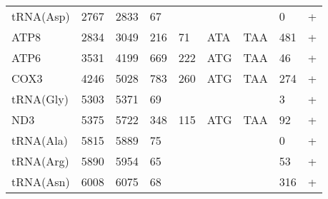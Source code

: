 \documentclass[../DISSERTACAO_MAIN.tex]{subfiles}
\begin{document}
\begin{longtable}{llllllllllllllllllllll}
			tRNA(Asp)    & 2767           & \multicolumn{2}{l}{2833}  & \multicolumn{2}{l}{67}         & \multicolumn{3}{l}{}                          & \multicolumn{3}{l}{}              & \multicolumn{3}{l}{}      & \multicolumn{3}{l}{0}           & \multicolumn{4}{l}{+}                  \\
			ATP8         & 2834           & \multicolumn{2}{l}{3049}  & \multicolumn{2}{l}{216}        & \multicolumn{3}{l}{71}                        & \multicolumn{3}{l}{ATA}           & \multicolumn{3}{l}{TAA}   & \multicolumn{3}{l}{481}         & \multicolumn{4}{l}{+}                  \\
			ATP6         & 3531           & \multicolumn{2}{l}{4199}  & \multicolumn{2}{l}{669}        & \multicolumn{3}{l}{222}                       & \multicolumn{3}{l}{ATG}           & \multicolumn{3}{l}{TAA}   & \multicolumn{3}{l}{46}          & \multicolumn{4}{l}{+}                  \\
			COX3         & 4246           & \multicolumn{2}{l}{5028}  & \multicolumn{2}{l}{783}        & \multicolumn{3}{l}{260}                       & \multicolumn{3}{l}{ATG}           & \multicolumn{3}{l}{TAA}   & \multicolumn{3}{l}{274}         & \multicolumn{4}{l}{+}                  \\
			tRNA(Gly)    & 5303           & \multicolumn{2}{l}{5371}  & \multicolumn{2}{l}{69}         & \multicolumn{3}{l}{}                          & \multicolumn{3}{l}{}              & \multicolumn{3}{l}{}      & \multicolumn{3}{l}{3}           & \multicolumn{4}{l}{+}                  \\
			ND3          & 5375           & \multicolumn{2}{l}{5722}  & \multicolumn{2}{l}{348}        & \multicolumn{3}{l}{115}                       & \multicolumn{3}{l}{ATG}           & \multicolumn{3}{l}{TAA}   & \multicolumn{3}{l}{92}          & \multicolumn{4}{l}{+}                  \\
			tRNA(Ala)    & 5815           & \multicolumn{2}{l}{5889}  & \multicolumn{2}{l}{75}         & \multicolumn{3}{l}{}                          & \multicolumn{3}{l}{}              & \multicolumn{3}{l}{}      & \multicolumn{3}{l}{0}           & \multicolumn{4}{l}{+}                  \\
			tRNA(Arg)    & 5890           & \multicolumn{2}{l}{5954}  & \multicolumn{2}{l}{65}         & \multicolumn{3}{l}{}                          & \multicolumn{3}{l}{}              & \multicolumn{3}{l}{}      & \multicolumn{3}{l}{53}          & \multicolumn{4}{l}{+}                  \\
			tRNA(Asn)    & 6008           & \multicolumn{2}{l}{6075}  & \multicolumn{2}{l}{68}         & \multicolumn{3}{l}{}                          & \multicolumn{3}{l}{}              & \multicolumn{3}{l}{}      & \multicolumn{3}{l}{316}         & \multicolumn{4}{l}{+}                  \\

\end{longtable}
\end{document}
